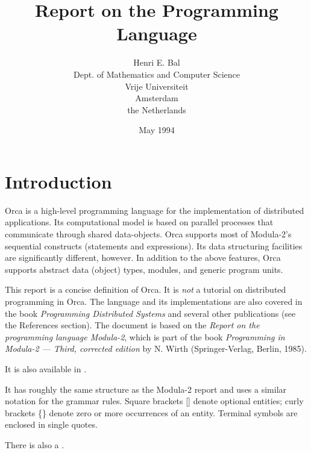 \documentclass[10pt]{article}
\begin{document}
\title{Report on the Programming Language
{}
{}}
\author{Henri E. Bal \\
Dept. of Mathematics and Computer Science \\
Vrije Universiteit \\
Amsterdam \\
the Netherlands}

\date{May 1994}

\maketitle

\section{Introduction}

Orca is a high-level programming language for the implementation of
distributed applications.
Its computational model is based on parallel processes that communicate
through shared data-objects.
Orca supports most of Modula-2's sequential constructs (statements and
expressions).
Its data structuring facilities are significantly different, however.
In addition to the above features, Orca supports abstract data (object) types,
modules, and generic program units.

This report is a concise definition of Orca.
It is {\em not} a tutorial on distributed programming in Orca.
The language and its implementations are also covered in the book
{\em Programming Distributed Systems}
and several other publications (see the References section).
The document is based on the {\em Report on
the programming language Modula-2}, which is part of the book
{\em Programming in Modula-2 --- Third, corrected edition} by N. Wirth
(Springer-Verlag, Berlin, 1985).
\begin{htmlonly}
It is also available in
.
\end{htmlonly}
It has roughly the same structure as the Modula-2 report and uses a
similar notation for the grammar rules.
Square brackets [] denote optional entities; curly brackets \{\}
denote zero or more occurrences of an entity.
Terminal symbols are enclosed in single quotes.
\begin{htmlonly}
There is also a
.
\end{htmlonly}
\end{document}
